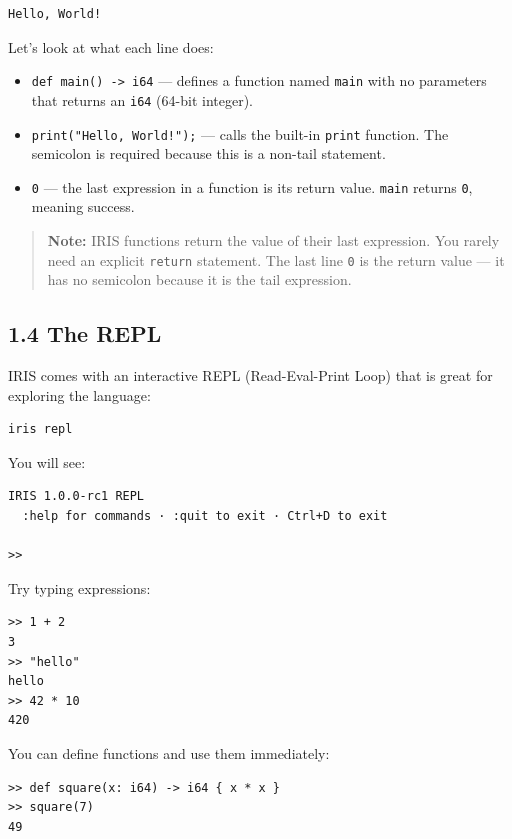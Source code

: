 \documentclass[
  english,
]{book}
\providecommand{\tightlist}{%
  \setlength{\itemsep}{0pt}\setlength{\parskip}{0pt}}
\begin{document}
\begin{verbatim}
Hello, World!
\end{verbatim}

Let's look at what each line does:

\begin{itemize}
\tightlist
\item
  \texttt{def\ main()\ -\textgreater{}\ i64} --- defines a function
  named \texttt{main} with no parameters that returns an \texttt{i64}
  (64-bit integer).
\item
  \texttt{print("Hello,\ World!");} --- calls the built-in
  \texttt{print} function. The semicolon is required because this is a
  non-tail statement.
\item
  \texttt{0} --- the last expression in a function is its return value.
  \texttt{main} returns \texttt{0}, meaning success.
\end{itemize}

\begin{quote}
\textbf{Note:} IRIS functions return the value of their last expression.
You rarely need an explicit \texttt{return} statement. The last line
\texttt{0} is the return value --- it has no semicolon because it is the
tail expression.
\end{quote}

\subsection{1.4 The REPL}\label{the-repl}

IRIS comes with an interactive REPL (Read-Eval-Print Loop) that is great
for exploring the language:

\begin{verbatim}
iris repl
\end{verbatim}

You will see:

\begin{verbatim}
IRIS 1.0.0-rc1 REPL
  :help for commands · :quit to exit · Ctrl+D to exit

>>
\end{verbatim}

Try typing expressions:

\begin{verbatim}
>> 1 + 2
3
>> "hello"
hello
>> 42 * 10
420
\end{verbatim}

You can define functions and use them immediately:

\begin{verbatim}
>> def square(x: i64) -> i64 { x * x }
>> square(7)
49
\end{verbatim}
\end{document}
